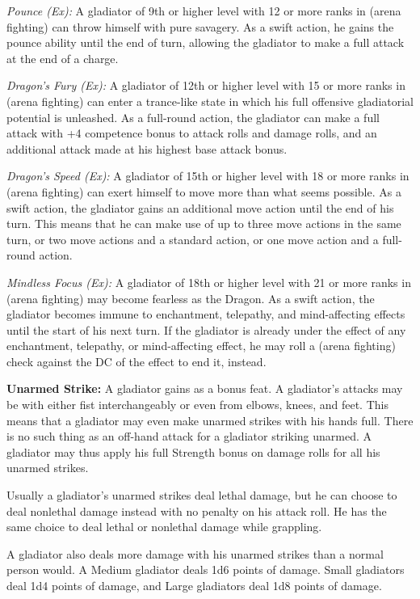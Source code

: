 \textit{Pounce (Ex):} A gladiator of 9th or higher level with 12 or more ranks in  (arena fighting) can throw himself with pure savagery. As a swift action, he gains the pounce ability until the end of turn, allowing the gladiator to make a full attack at the end of a charge.

\textit{Dragon's Fury (Ex):} A gladiator of 12th or higher level with 15 or more ranks in  (arena fighting) can enter a trance-like state in which his full offensive gladiatorial potential is unleashed. As a full-round action, the gladiator can make a full attack with +4 competence bonus to attack rolls and damage rolls, and an additional attack made at his highest base attack bonus.

\textit{Dragon's Speed (Ex):} A gladiator of 15th or higher level with 18 or more ranks in  (arena fighting) can exert himself to move more than what seems possible. As a swift action, the gladiator gains an additional move action until the end of his turn. This means that he can make use of up to three move actions in the same turn, or two move actions and a standard action, or one move action and a full-round action.

\textit{Mindless Focus (Ex):} A gladiator of 18th or higher level with 21 or more ranks in  (arena fighting) may become fearless as the Dragon. As a swift action, the gladiator becomes immune to enchantment, telepathy, and mind-affecting effects until the start of his next turn. If the gladiator is already under the effect of any enchantment, telepathy, or mind-affecting effect, he may roll a  (arena fighting) check against the DC of the effect to end it, instead.

\textbf{Unarmed Strike:} A gladiator gains  as a bonus feat. A gladiator's attacks may be with either fist interchangeably or even from elbows, knees, and feet. This means that a gladiator may even make unarmed strikes with his hands full. There is no such thing as an off-hand attack for a gladiator striking unarmed. A gladiator may thus apply his full Strength bonus on damage rolls for all his unarmed strikes.

Usually a gladiator's unarmed strikes deal lethal damage, but he can choose to deal nonlethal damage instead with no penalty on his attack roll. He has the same choice to deal lethal or nonlethal damage while grappling.

A gladiator also deals more damage with his unarmed strikes than a normal person would. A Medium gladiator deals 1d6 points of damage. Small gladiators deal 1d4 points of damage, and Large gladiators deal 1d8 points of damage.

